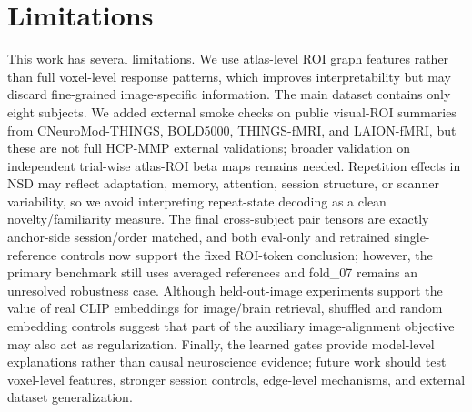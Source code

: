 \documentclass{article}
\begin{document}
\section{Limitations}
\label{sec:limitations}

This work has several limitations. We use atlas-level ROI graph features rather than full voxel-level response patterns, which improves interpretability but may discard fine-grained image-specific information. The main dataset contains only eight subjects. We added external smoke checks on public visual-ROI summaries from CNeuroMod-THINGS, BOLD5000, THINGS-fMRI, and LAION-fMRI, but these are not full HCP-MMP external validations; broader validation on independent trial-wise atlas-ROI beta maps remains needed. Repetition effects in NSD may reflect adaptation, memory, attention, session structure, or scanner variability, so we avoid interpreting repeat-state decoding as a clean novelty/familiarity measure. The final cross-subject pair tensors are exactly anchor-side session/order matched, and both eval-only and retrained single-reference controls now support the fixed ROI-token conclusion; however, the primary benchmark still uses averaged references and fold\_07 remains an unresolved robustness case. Although held-out-image experiments support the value of real CLIP embeddings for image/brain retrieval, shuffled and random embedding controls suggest that part of the auxiliary image-alignment objective may also act as regularization. Finally, the learned gates provide model-level explanations rather than causal neuroscience evidence; future work should test voxel-level features, stronger session controls, edge-level mechanisms, and external dataset generalization.



\end{document}
